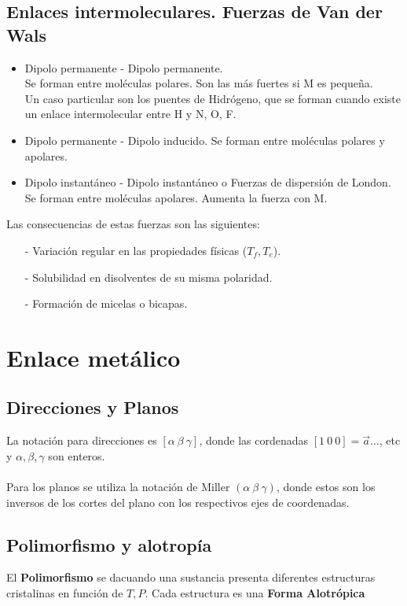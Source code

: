 \documentclass[12pt]{article}
\begin{document}
\subsection{Enlaces intermoleculares. Fuerzas de Van der Wals}
\begin{itemize}
	\item Dipolo permanente - Dipolo permanente. \\
	Se forman entre moléculas polares. Son las más fuertes si M es pequeña.\\
	Un caso particular son los puentes de Hidrógeno, que se forman cuando existe un enlace intermolecular entre H y N, O, F.
	\item Dipolo permanente - Dipolo inducido.
	Se forman entre moléculas polares y apolares.
	\item Dipolo instantáneo - Dipolo instantáneo o Fuerzas de dispersión de London.\\
	Se forman entre moléculas apolares. Aumenta la fuerza con M.
	
\end{itemize}

Las consecuencias de estas fuerzas son las siguientes:
\begin{itemize}
	\item[-] Variación regular en las propiedades físicas ($T_f, T_e$).
	\item[-] Solubilidad en disolventes de su misma polaridad.
	\item[-] Formación de micelas o bicapas.
\end{itemize}

\section{Enlace metálico}
	\subsection{Direcciones y Planos}
La notación para direcciones es $[\alpha \ \beta \ \gamma]$, donde las 			cordenadas $[1\ 0\ 0] = \vec{a}...$, etc y $\alpha, \beta,\gamma$ son enteros.\\ \\
Para los planos se utiliza la notación de Miller $(\alpha \ \beta \ \gamma)$, donde estos son los inversos de los cortes del plano con los respectivos ejes de coordenadas.

	\subsection{Polimorfismo y alotropía}
El \textbf{Polimorfismo} se dacuando una sustancia presenta diferentes estructuras cristalinas en función de $T, P$. Cada estructura es una \textbf{Forma Alotrópica}
\end{document}
